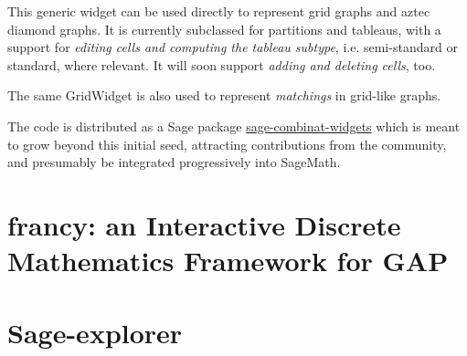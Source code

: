 \documentclass{deliverablereport}
\begin{document}
This generic widget can be used directly to represent grid graphs and
aztec diamond graphs. It is currently subclassed for partitions
and tableaus, with a support for \emph{editing cells and computing the
tableau subtype}, i.e. semi-standard or standard, where relevant. It
will soon support \emph{adding and deleting cells}, too.

The same GridWidget is also used to represent \emph{matchings} in grid-like
graphs.


The code is distributed as a Sage package
\href{https://github.com/sagemath/sage-combinat-widgets/}{sage-combinat-widgets}
which is meant to grow beyond this initial seed, attracting
contributions from the community, and presumably be integrated
progressively into SageMath.


\section{francy: an Interactive Discrete Mathematics Framework for GAP}




\section{Sage-explorer}
\label{sage-explorer}








\appendix

\end{document}
